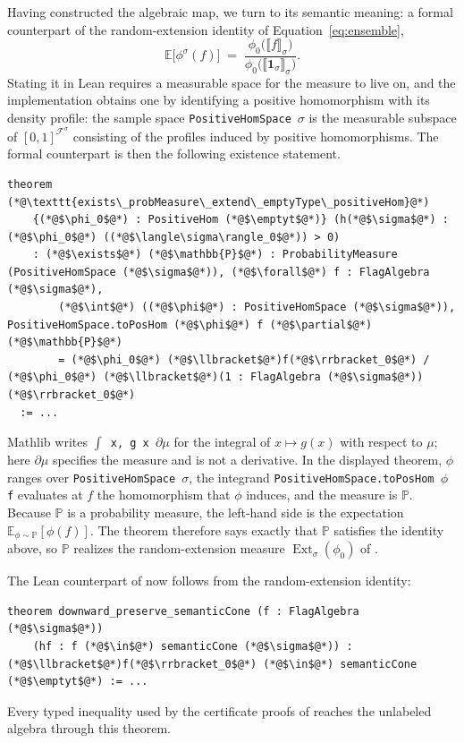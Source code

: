 \documentclass[acmsmall,screen=true,acmthm=false]{acmart}
\DeclareRobustCommand{\lean}[1]{{\def\_{\textunderscore\allowbreak}\texttt{#1}}}
\newcommand{\emptyt}{\emptyset_{\mathrm{t}}}
\newcommand{\Ext}{\operatorname{Ext}}
\begin{document}
Having constructed the algebraic map, we turn to its semantic meaning: a
formal counterpart of the random-extension identity of
Equation~\eqref{eq:ensemble},
\[
  \mathbb{E}\bigl[\phi^\sigma(f)\bigr]
  \;=\;
  \frac{\phi_0\bigl(\llbracket f \rrbracket_\sigma\bigr)}
       {\phi_0\bigl(\llbracket \mathbf{1}_\sigma \rrbracket_\sigma\bigr)}.
\]
Stating it in Lean requires a measurable space for the measure to live on,
and the implementation obtains one by identifying a positive homomorphism
with its density profile: the sample space \lean{PositiveHomSpace}~$\sigma$ is
the measurable subspace of \([0,1]^{\mathcal{F}^\sigma}\) consisting of the
profiles induced by positive homomorphisms.  The formal counterpart is then
the following existence statement.
\begin{lstlisting}
theorem (*@\texttt{exists\_probMeasure\_extend\_emptyType\_positiveHom}@*)
    {(*@$\phi_0$@*) : PositiveHom (*@$\emptyt$@*)} (h(*@$\sigma$@*) : (*@$\phi_0$@*) ((*@$\langle\sigma\rangle_0$@*)) > 0)
    : (*@$\exists$@*) (*@$\mathbb{P}$@*) : ProbabilityMeasure (PositiveHomSpace (*@$\sigma$@*)), (*@$\forall$@*) f : FlagAlgebra (*@$\sigma$@*),
        (*@$\int$@*) ((*@$\phi$@*) : PositiveHomSpace (*@$\sigma$@*)), PositiveHomSpace.toPosHom (*@$\phi$@*) f (*@$\partial$@*)(*@$\mathbb{P}$@*)
        = (*@$\phi_0$@*) (*@$\llbracket$@*)f(*@$\rrbracket_0$@*) / (*@$\phi_0$@*) (*@$\llbracket$@*)(1 : FlagAlgebra (*@$\sigma$@*))(*@$\rrbracket_0$@*)
  := ...
\end{lstlisting}
Mathlib writes \lean{$\int$ x, g x $\partial\mu$} for the integral of
$x\mapsto g(x)$ with respect to $\mu$; here $\partial\mu$ specifies the
measure and is not a derivative.  In the displayed theorem, $\phi$ ranges over
\lean{PositiveHomSpace}~$\sigma$, the integrand
\lean{PositiveHomSpace.toPosHom $\phi$ f} evaluates at $f$ the homomorphism
that $\phi$ induces, and the measure is $\mathbb{P}$.  Because
$\mathbb{P}$ is a probability measure, the left-hand side is the expectation
$\mathbb{E}_{\phi\sim \mathbb{P}}[\phi(f)]$.  The theorem therefore says
exactly that $\mathbb{P}$ satisfies the identity above, so $\mathbb{P}$
realizes the random-extension measure $\Ext_\sigma(\phi_0)$
of .

The Lean counterpart of  now follows from the
random-extension identity:
\begin{lstlisting}
theorem downward_preserve_semanticCone (f : FlagAlgebra (*@$\sigma$@*))
    (hf : f (*@$\in$@*) semanticCone (*@$\sigma$@*)) : (*@$\llbracket$@*)f(*@$\rrbracket_0$@*) (*@$\in$@*) semanticCone (*@$\emptyt$@*) := ...
\end{lstlisting}
Every typed inequality used by the certificate proofs of
 reaches the unlabeled algebra through this theorem.
\end{document}
